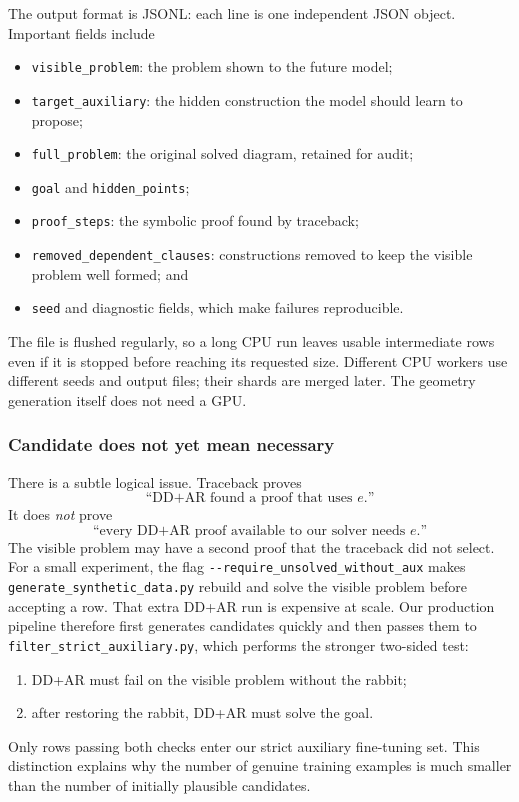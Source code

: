 \documentclass[reqno]{amsart}
\DeclareMathOperator{\1}{\textbf{1}}
\begin{document}
The output format is JSONL: each line is one independent JSON object. Important
fields include
\begin{itemize}
    \item \verb|visible_problem|: the problem shown to the future model;
    \item \verb|target_auxiliary|: the hidden construction the model should
          learn to propose;
    \item \verb|full_problem|: the original solved diagram, retained for audit;
    \item \verb|goal| and \verb|hidden_points|;
    \item \verb|proof_steps|: the symbolic proof found by traceback;
    \item \verb|removed_dependent_clauses|: constructions removed to keep the
          visible problem well formed; and
    \item \verb|seed| and diagnostic fields, which make failures reproducible.
\end{itemize}
The file is flushed regularly, so a long CPU run leaves usable intermediate
rows even if it is stopped before reaching its requested size. Different CPU
workers use different seeds and output files; their shards are merged later.
The geometry generation itself does not need a GPU.

\subsubsection{Candidate does not yet mean necessary}

There is a subtle logical issue. Traceback proves
\[
  \text{``DD+AR found a proof that uses }e\text{.''}
\]
It does \emph{not} prove
\[
  \text{``every DD+AR proof available to our solver needs }e\text{.''}
\]
The visible problem may have a second proof that the traceback did not select.
For a small experiment, the flag \verb|--require_unsolved_without_aux| makes
\verb|generate_synthetic_data.py| rebuild and solve the visible problem before
accepting a row. That extra DD+AR run is expensive at scale. Our production
pipeline therefore first generates candidates quickly and then passes them to
\verb|filter_strict_auxiliary.py|, which performs the stronger two-sided test:
\begin{enumerate}
    \item DD+AR must fail on the visible problem without the rabbit;
    \item after restoring the rabbit, DD+AR must solve the goal.
\end{enumerate}
Only rows passing both checks enter our strict auxiliary fine-tuning set. This
distinction explains why the number of genuine training examples is much
smaller than the number of initially plausible candidates.
\end{document}
